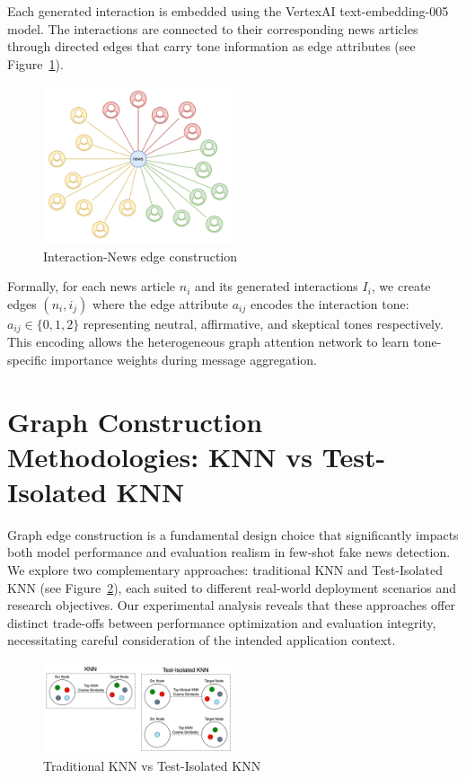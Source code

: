 Each generated interaction is embedded using the VertexAI text-embedding-005 model. The interactions are connected to their corresponding news articles through directed edges that carry tone information as edge attributes (see Figure~\ref{fig:news_interaction_node}).

\begin{figure}[h]
    \centering
    \includegraphics[width=0.5\textwidth]{context/methodology/fig/news_interaction_node.png}
    \caption{Interaction-News edge construction}
    \label{fig:news_interaction_node}
\end{figure}

Formally, for each news article $n_i$ and its generated interactions $I_i$, we create edges $(n_i, i_j)$ where the edge attribute $a_{ij}$ encodes the interaction tone: $a_{ij} \in \{0, 1, 2\}$ representing neutral, affirmative, and skeptical tones respectively. This encoding allows the heterogeneous graph attention network to learn tone-specific importance weights during message aggregation.

\section{Graph Construction Methodologies: KNN vs Test-Isolated KNN}

Graph edge construction is a fundamental design choice that significantly impacts both model performance and evaluation realism in few-shot fake news detection. We explore two complementary approaches: traditional KNN and Test-Isolated KNN (see Figure~\ref{fig:edge_construction}), each suited to different real-world deployment scenarios and research objectives. Our experimental analysis reveals that these approaches offer distinct trade-offs between performance optimization and evaluation integrity, necessitating careful consideration of the intended application context.

\begin{figure}[h]
    \centering
    \includegraphics[width=0.5\textwidth]{context/methodology/fig/edge_construction.png}
    \caption{Traditional KNN vs Test-Isolated KNN}
    \label{fig:edge_construction}
\end{figure}

